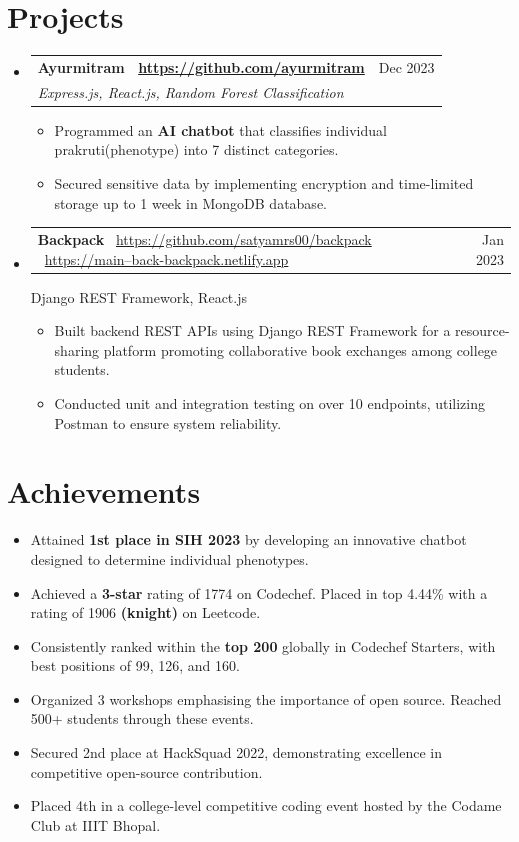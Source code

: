 \documentclass[a4paper,10pt]{article}
\makeatletter
\newcommand{\resumeSubheading}[4]{
\item
\begin{tabular*}{0.97\textwidth}{l@{\extracolsep{\fill}}r}
\textbf{#1} & #2 \\
\textit{#3} & \textit{#4} \\
\end{tabular*}
}
\newcommand{\resumeSmallSubheading}[2]{
\item
\begin{tabular*}{0.97\textwidth}{l@{\extracolsep{\fill}}r}
#1 & #2 \\
\end{tabular*}
}
\newcommand{\resumeSubHeadingListStart}{\begin{itemize}[leftmargin=*]}
\newcommand{\resumeSubHeadingListEnd}{\end{itemize}}
\makeatother
\begin{document}
\section{Projects}
\resumeSubHeadingListStart

\resumeSubheading{\textbf{Ayurmitram} \textbar ~\href{https://github.com/ayurmitram/}{https://github.com/ayurmitram}}{Dec 2023}{Express.js, React.js, Random Forest Classification}{}
\begin{itemize}
\item Programmed an \textbf{AI chatbot} that classifies individual prakruti(phenotype) into 7 distinct categories.
\item Secured sensitive data by implementing encryption and time-limited storage up to 1 week in MongoDB database.
\end{itemize}

\resumeSmallSubheading{\textbf{Backpack} \textbar ~\href{https://github.com/satyamrs00/backpack/}{https://github.com/satyamrs00/backpack} \textbar ~\href{https://main--back-backpack.netlify.app/}{https://main--back-backpack.netlify.app}}{Jan 2023}{Django REST Framework, React.js}{}
\begin{itemize}
\item Built backend REST APIs using Django REST Framework for a resource-sharing platform promoting collaborative book exchanges among college students.
\item Conducted unit and integration testing on over 10 endpoints, utilizing Postman to ensure system reliability.
\end{itemize}

\resumeSubHeadingListEnd

\section{Achievements}
\begin{itemize}
\item Attained \textbf{1st place in SIH 2023} by developing an innovative chatbot designed to determine individual phenotypes.
\item Achieved a \textbf{3-star} rating of 1774 on Codechef. Placed in top 4.44\% with a rating of 1906 \textbf{(knight)} on Leetcode.
\item Consistently ranked within the \textbf{top 200} globally in Codechef Starters, with best positions of 99, 126, and 160.
\item Organized 3 workshops emphasising the importance of open source. Reached 500+ students through these events.
\item Secured 2nd place at HackSquad 2022, demonstrating excellence in competitive open-source contribution.
\item Placed 4th in a college-level competitive coding event hosted by the Codame Club at IIIT Bhopal.
\end{itemize}
\end{document}
